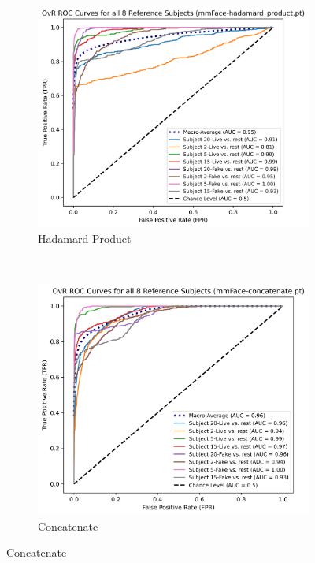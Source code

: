 \documentclass{mpaper}
\begin{document}
\begin{figure}[h!]
    \centering
    \begin{subfigure}[b]{0.31\textwidth}
        \includegraphics[width=\textwidth]{figures/roc_hadamard_product.png}
        \caption{Hadamard Product}
        \label{fig:roc_hadamard_product}
    \end{subfigure}
    ~
    \begin{subfigure}[b]{0.3\textwidth}
        \includegraphics[width=\textwidth]{figures/roc_concatenate.png}
        \caption{Concatenate}

\end{subfigure}
\end{figure}
\end{document}
